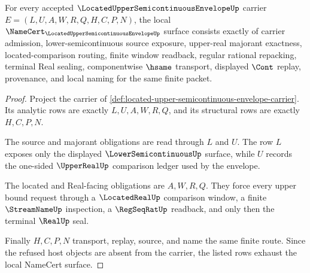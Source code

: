 \begin{theorem}
\label{thm:located-upper-semicontinuous-envelope-obligation-surface}
For every accepted $\LocatedUpperSemicontinuousEnvelopeUp$ carrier
$E=(L,U,A,W,R,Q,H,C,P,N)$, the local
$\NameCert_{\LocatedUpperSemicontinuousEnvelopeUp}$ surface consists exactly
of carrier admission, lower-semicontinuous source exposure, upper-real
majorant exactness, located-comparison routing, finite window readback,
regular rational repacking, terminal Real sealing, componentwise $\hsame$
transport, displayed $\Cont$ replay, provenance, and local naming for the
same finite packet.
\end{theorem}
\begin{proof}
Project the carrier of
\autoref{def:located-upper-semicontinuous-envelope-carrier}. Its analytic
rows are exactly $L,U,A,W,R,Q$, and its structural rows are exactly
$H,C,P,N$.

The source and majorant obligations are read through $L$ and $U$. The row
$L$ exposes only the displayed $\LowerSemicontinuousUp$ surface, while $U$
records the one-sided $\UpperRealUp$ comparison ledger used by the envelope.

The located and Real-facing obligations are $A,W,R,Q$. They force every
upper bound request through a $\LocatedRealUp$ comparison window, a finite
$\StreamNameUp$ inspection, a $\RegSeqRatUp$ readback, and only then the
terminal $\RealUp$ seal.

Finally $H,C,P,N$ transport, replay, source, and name the same finite route.
Since the refused host objects are absent from the carrier, the listed rows
exhaust the local NameCert surface.
\end{proof}

